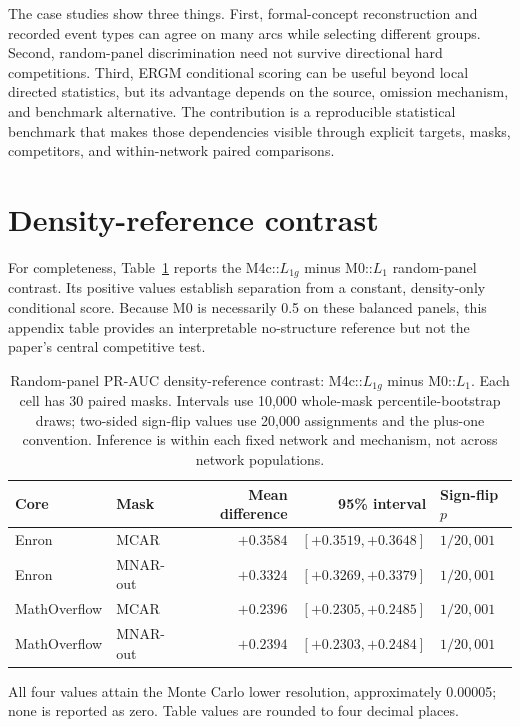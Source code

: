 \documentclass[10pt]{article}
\begin{document}
The case studies show three things. First, formal-concept reconstruction and recorded event types can agree on many arcs while selecting different groups. Second, random-panel discrimination need not survive directional hard competitions. Third, ERGM conditional scoring can be useful beyond local directed statistics, but its advantage depends on the source, omission mechanism, and benchmark alternative. The contribution is a reproducible statistical benchmark that makes those dependencies visible through explicit targets, masks, competitors, and within-network paired comparisons.

\appendix
\section{Density-reference contrast}
\label{app:density}
For completeness, Table~\ref{tab:density} reports the M4c::$L_{1g}$ minus M0::$L_1$ random-panel contrast. Its positive values establish separation from a constant, density-only conditional score. Because M0 is necessarily 0.5 on these balanced panels, this appendix table provides an interpretable no-structure reference but not the paper's central competitive test.

\begin{table}[H]
\centering
\caption{Random-panel PR-AUC density-reference contrast: M4c::$L_{1g}$ minus M0::$L_1$. Each cell has 30 paired masks. Intervals use 10,000 whole-mask percentile-bootstrap draws; two-sided sign-flip values use 20,000 assignments and the plus-one convention. Inference is within each fixed network and mechanism, not across network populations.}
\label{tab:density}
\small
\begin{tabular}{@{}llrrl@{}}
\toprule
Core & Mask & Mean difference & 95\% interval & Sign-flip $p$\\
\midrule
Enron & MCAR & $+0.3584$ & $[+0.3519,+0.3648]$ & $1/20{,}001$\\
Enron & MNAR-out & $+0.3324$ & $[+0.3269,+0.3379]$ & $1/20{,}001$\\
MathOverflow & MCAR & $+0.2396$ & $[+0.2305,+0.2485]$ & $1/20{,}001$\\
MathOverflow & MNAR-out & $+0.2394$ & $[+0.2303,+0.2484]$ & $1/20{,}001$\\
\bottomrule
\end{tabular}
\par\vspace{3pt}\footnotesize All four values attain the Monte Carlo lower resolution, approximately 0.00005; none is reported as zero. Table values are rounded to four decimal places.
\end{table}
\end{document}
